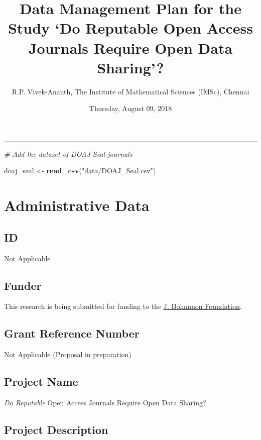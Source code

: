 \documentclass[]{article}
\title{Data Management Plan for the Study `Do Reputable Open Access Journals
Require Open Data Sharing'?}
\author{R.P. Vivek-Ananth, The Institute of Mathematical Sciences (IMSc),
Chennai}
\date{Thursday, August 09, 2018}
\newenvironment{Shaded}{\begin{snugshade}}{\end{snugshade}}
\newcommand{\KeywordTok}[1]{\textcolor[rgb]{0.13,0.29,0.53}{\textbf{#1}}}
\newcommand{\StringTok}[1]{\textcolor[rgb]{0.31,0.60,0.02}{#1}}
\newcommand{\CommentTok}[1]{\textcolor[rgb]{0.56,0.35,0.01}{\textit{#1}}}
\newcommand{\NormalTok}[1]{#1}
\begin{document}
\maketitle

{
\setcounter{tocdepth}{2}
\tableofcontents
}
\begin{center}\rule{0.5\linewidth}{\linethickness}\end{center}

\begin{Shaded}
\begin{Highlighting}[]
\CommentTok{# Add the dataset of DOAJ Seal journals}

\NormalTok{doaj_seal <-}\StringTok{ }\KeywordTok{read_csv}\NormalTok{(}\StringTok{"data/DOAJ_Seal.csv"}\NormalTok{)}
\end{Highlighting}
\end{Shaded}

\section{Administrative Data}\label{administrative-data}

\subsection{ID}\label{id}

Not Applicable

\subsection{Funder}\label{funder}

This research is being submitted for funding to the
\href{http://www.johnbohannon.org/}{J. Bohannon Foundation}.

\subsection{Grant Reference Number}\label{grant-reference-number}

Not Applicable (Proposal in preparation)

\subsection{Project Name}\label{project-name}

\emph{Do Reputable} Open Access Journals Require Open Data Sharing?

\subsection{Project Description}\label{project-description}
\end{document}
